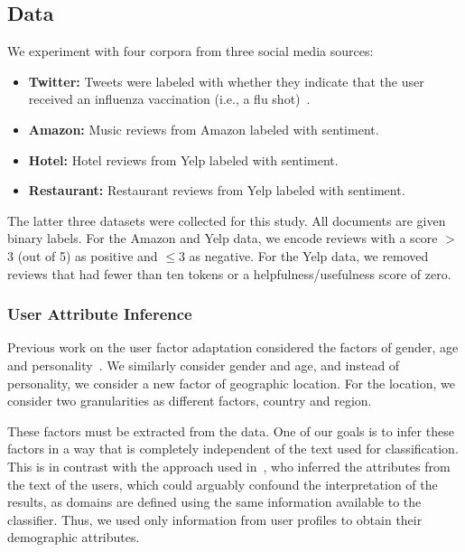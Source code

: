 \subsection{Data}
\label{chap4:subsec:data1}

We experiment with four corpora from three social media sources:
\begin{itemize}
\setlength\itemsep{0ex}
    \item {\bf Twitter:} Tweets were labeled with whether they indicate that the user received an influenza vaccination (i.e., a flu shot)~\cite{huang2017examining}.
    \item {\bf Amazon:} Music reviews from Amazon labeled with sentiment.
    \item {\bf Hotel:} Hotel reviews from Yelp labeled with sentiment.
    \item {\bf Restaurant:} Restaurant reviews from Yelp labeled with sentiment.
\end{itemize}

The latter three datasets were collected for this study.
All documents are given binary labels.
For the Amazon and Yelp data, we encode reviews with a score $>$$3$ (out of 5) as positive and $\leq$$3$ as negative.
For the Yelp data, we removed reviews that had fewer than ten tokens or a helpfulness/usefulness score of zero. 


\subsubsection{User Attribute Inference}

Previous work on the user factor adaptation considered the factors of gender, age and personality~\cite{lynn2017human}.
We similarly consider gender and age, and instead of personality, we consider a new factor of geographic location.
For the location, we consider two granularities as different factors, country and region.

These factors must be extracted from the data.
One of our goals is to infer these factors
in a way that is completely independent of the text used for classification.
This is in contrast with the approach used in~\cite{lynn2017human, wood2020using},
who inferred the attributes from the text of the users,
which could arguably confound the interpretation of the results,
as domains are defined using the same information available to the classifier.
Thus, we used only information from user profiles to obtain their demographic attributes.


